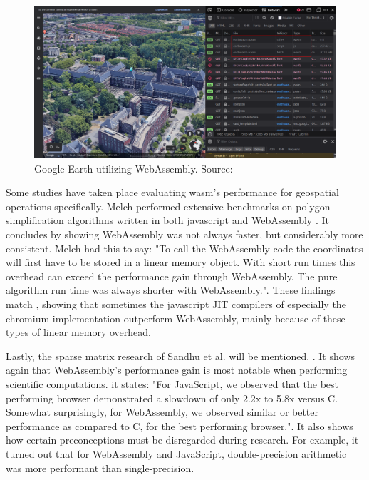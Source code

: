 \begin{figure}[!tbp]
  \centering
  \begin{minipage}[b]{0.80\textwidth}
    \includegraphics[width=\textwidth]{../images/google-earth-uses-webassembly.PNG}
    \caption{Google Earth utilizing WebAssembly. Source: \cite{google_google_2020}}
    \label{fig:google-earth}
  \end{minipage}
\end{figure}

Some studies have taken place evaluating \ac{wasm}'s performance for geospatial operations specifically. Melch performed extensive benchmarks on polygon simplification algorithms written in both javascript and WebAssembly \cite{melch_performance_2019}. It concludes by showing WebAssembly was not always faster, but considerably more consistent. Melch had this to say: "To call the WebAssembly code the coordinates will first have to be stored in a linear memory object. With short run times this overhead can exceed the performance gain through WebAssembly. The pure algorithm run time was always shorter with WebAssembly.". These findings match \cite{jangda_not_2019}, showing that sometimes the javascript JIT compilers of especially the chromium implementation outperform WebAssembly, mainly because of these types of linear memory overhead.

Lastly, the sparse matrix research of Sandhu et al. will be mentioned. \cite{sandhu_sparse_2018}. It shows again that WebAssembly's performance gain is most notable when performing scientific computations. it states: "For JavaScript, we observed that the best performing browser demonstrated a slowdown of only 2.2x to 5.8x versus C. Somewhat surprisingly, for WebAssembly, we observed similar or better performance as compared to C, for the best performing browser.". It also shows how certain preconceptions must be disregarded during research. For example, it turned out that for WebAssembly and JavaScript, double-precision arithmetic was more performant than single-precision.


